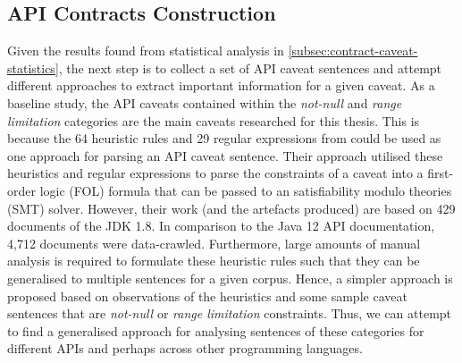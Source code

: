 \subsection{API Contracts Construction}
\label{subsec:contract-construct}
Given the results found from statistical analysis in \ref{subsec:contract-caveat-statistics}, the next step is to collect a set of API caveat sentences and attempt different approaches to extract important information for a given caveat. As a baseline study, the API caveats contained within the \textit{not-null} and \textit{range limitation} categories are the main caveats researched for this thesis. This is because the 64 heuristic rules and 29 regular expressions from \cite{zhou-directive} could be used as one approach for parsing an API caveat sentence. Their approach utilised these heuristics and regular expressions to parse the constraints of a caveat into a first-order logic (FOL) formula that can be passed to an satisfiability modulo theories (SMT) solver. However, their work (and the artefacts produced) are based on 429 documents of the JDK 1.8. In comparison to the Java 12 API documentation, 4,712 documents were data-crawled. Furthermore, large amounts of manual analysis is required to formulate these heuristic rules such that they can be generalised to multiple sentences for a given corpus. Hence, a simpler approach is proposed based on observations of the heuristics and some sample caveat sentences that are \textit{not-null} or \textit{range limitation} constraints. Thus, we can attempt to find a generalised approach for analysing sentences of these categories for different APIs and perhaps across other programming languages. \\


